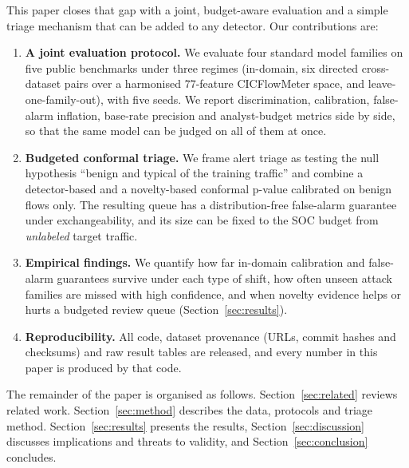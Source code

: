 This paper closes that gap with a joint, budget-aware evaluation and a simple triage mechanism that can be added to any detector. Our contributions are:
\begin{enumerate}
\item \textbf{A joint evaluation protocol.} We evaluate four standard model families on five public benchmarks under three regimes (in-domain, six directed cross-dataset pairs over a harmonised 77-feature CICFlowMeter space, and leave-one-family-out), with five seeds. We report discrimination, calibration, false-alarm inflation, base-rate precision and analyst-budget metrics side by side, so that the same model can be judged on all of them at once.
\item \textbf{Budgeted conformal triage.} We frame alert triage as testing the null hypothesis ``benign and typical of the training traffic'' and combine a detector-based and a novelty-based conformal p-value calibrated on benign flows only. The resulting queue has a distribution-free false-alarm guarantee under exchangeability, and its size can be fixed to the SOC budget from \emph{unlabeled} target traffic.
\item \textbf{Empirical findings.} We quantify how far in-domain calibration and false-alarm guarantees survive under each type of shift, how often unseen attack families are missed with high confidence, and when novelty evidence helps or hurts a budgeted review queue (Section~\ref{sec:results}).
\item \textbf{Reproducibility.} All code, dataset provenance (URLs, commit hashes and checksums) and raw result tables are released, and every number in this paper is produced by that code.
\end{enumerate}

The remainder of the paper is organised as follows. Section~\ref{sec:related} reviews related work. Section~\ref{sec:method} describes the data, protocols and triage method. Section~\ref{sec:results} presents the results, Section~\ref{sec:discussion} discusses implications and threats to validity, and Section~\ref{sec:conclusion} concludes.
